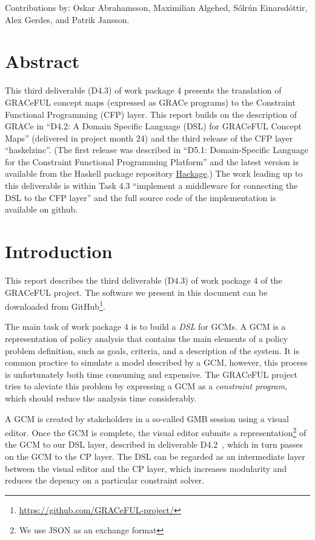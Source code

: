 \documentclass{article}
\newcommand{\grace}{GRACeFUL\xspace}
\begin{document}
Contributions by: Oskar Abrahamsson, Maximilian Algehed, Sólrún
Einarsdóttir, Alex Gerdes, and Patrik Jansson.

\vfill

\setcounter{tocdepth}{2}
\tableofcontents

\vfill

\newpage

\section*{Abstract}\label{abstract}

This third deliverable (D4.3) of work package 4 presents the
translation of GRACeFUL concept maps (expressed as GRACe programs) to
the Constraint Functional Programming (CFP) layer.
%
This report builds on the description of GRACe in ``D4.2: A Domain
Specific Language (DSL) for GRACeFUL Concept Maps'' (delivered in
project month 24) and the third release of the CFP layer ``haskelzinc''.
%
(The first release was described in ``D5.1: Domain-Specific Language
for the Constraint Functional Programming Platform'' and the latest
version is available from the Haskell package repository
\href{https://hackage.haskell.org/package/haskelzinc}{Hackage}.)
%
The work leading up to this deliverable is within Task 4.3 ``implement
a middleware for connecting the DSL to the CFP layer'' and the full
source code of the implementation is available on github.


\section{Introduction}

This report describes the third deliverable (D4.3) of work package 4 of the
\grace project. The software we present in this document can be downloaded
from GitHub\footnote{\url{https://github.com/GRACeFUL-project/}}.

The main task of work package 4 is to build a \emph{\ac{DSL}} for \acp{GCM}. A
\ac{GCM} is a representation of policy analysis that contains the main elements
of a policy problem definition, such as goals, criteria, and a description of
the system. It is common practice to simulate a model described by a \ac{GCM},
however, this process is unfortunately both time consuming and expensive. The
\grace project tries to aleviate this problem by expressing a \ac{GCM} as a
\emph{constraint program}, which should reduce the analysis time considerably.

A \ac{GCM} is created by stakeholders in a so-called \ac{GMB} session using a
visual editor. Once the \ac{GCM} is complete, the visual editor submits a
representation\footnote{We use \ac{JSON} as an exchange format} of the \ac{GCM}
to our \ac{DSL} layer, described in deliverable D4.2~\cite{D4.2}, which in turn
passes on the \ac{GCM} to the \ac{CP} layer. The \ac{DSL} can be regarded as an
intermediate layer between the visual editor and the \ac{CP} layer, which
increases modularity and reduces the depency on a particular constraint solver. 
\end{document}
